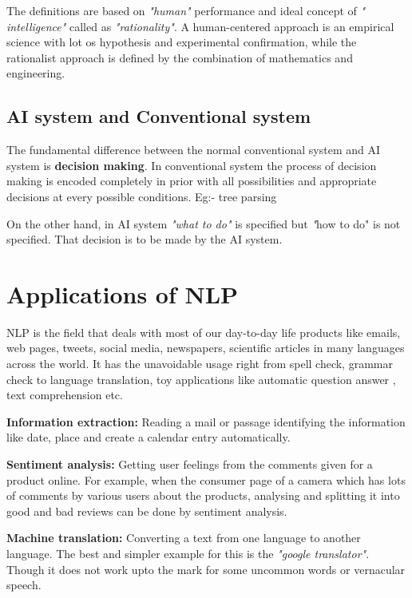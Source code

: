 \documentclass{bmcart}
\begin{document}
The definitions are based on \textit{"human"} performance and ideal concept of \textit{" intelligence"} called as \textit{"rationality"}. A human-centered approach is an empirical science with lot os hypothesis and experimental confirmation, while the rationalist approach is defined by the combination of mathematics and engineering. 

\subsection{AI system and Conventional system}
\label{ssec:ai-and-normal-sys}

The fundamental difference between the normal conventional system and AI system is \textbf{decision making}. In conventional system the process of decision making is encoded completely in prior with all possibilities and appropriate decisions at every possible conditions. Eg:- tree parsing

On the other hand, in AI system \textit{"what to do"} is specified but {\textit "how to do"} is not specified. That decision is to be made by the AI system. 

\section{Applications of NLP}
\label{sec:appl}
NLP is the field that deals with most of our day-to-day life products like emails, web pages, tweets, social media, newspapers, scientific articles in many languages across the world. It has the unavoidable usage right from spell check, grammar check to language translation, toy applications like automatic question answer , text comprehension etc. 

\textbf{Information extraction:} Reading a mail or passage identifying the information like date, place and create a calendar entry automatically. 

\textbf{Sentiment analysis:} Getting user feelings from the comments given for a product online. For example, when the consumer page of a camera which has lots of comments by various users about the products, analysing and splitting it into good and bad reviews can be done by sentiment analysis. 

\textbf{Machine translation:} Converting a text from one language to another language. The best and simpler example for this is the \textit{"google translator"}. Though it does not work upto the mark for some uncommon words or vernacular speech.
\end{document}
